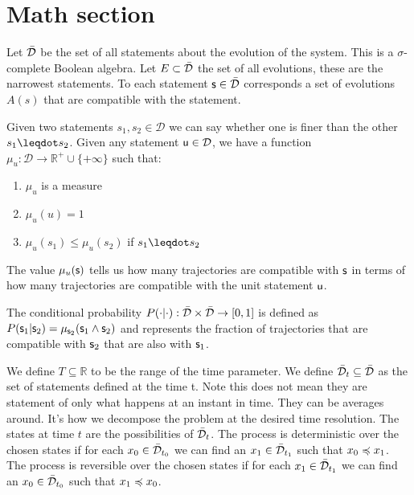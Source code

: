 \documentclass[letterpaper]{article}
\begin{document}
\section{Math section}

Let $\tdomain$ be the set of all statements about the evolution of the system. This is a $\sigma$-complete Boolean algebra. Let $E \subset \tdomain$ the set of all evolutions, these are the narrowest statements. To each statement $\stmt \in \tdomain$ corresponds a set of evolutions $A(s)$ that are compatible with the statement.

Given two statements $s_1, s_2 \in \mathcal{D}$ we can say whether one is finer than the other $s_1 \finer s_2$. Given any statement $\stmt[u] \in \mathcal{D}$, we have a function $\mu_u : \mathcal{D} \to \mathbb{R}^+\cup \{+\infty \}$ such that:
\begin{enumerate}
	\item $\mu_u$ is a measure
	\item $\mu_u(u) = 1$
	\item $\mu_u(s_1) \leq \mu_u(s_2)$ if $s_1 \finer s_2$
\end{enumerate}
The value $\mu_u(\stmt)$ tells us how many trajectories are compatible with $\stmt$ in terms of how many trajectories are compatible with the unit statement $\stmt[u]$.

The conditional probability $P(\cdot | \cdot) : \tdomain \times \tdomain \to [0,1]$ is defined as $P(\stmt_1 | \stmt_2) = \mu_{\stmt_2}(\stmt_1 \AND \stmt_2)$ and represents the fraction of trajectories that are compatible with $\stmt_2$ that are also with $\stmt_1$.

We define $T \subseteq \mathbb{R}$ to be the range of the time parameter. We define $\tdomain_{t} \subseteq \tdomain$ as the set of statements defined at the time t. Note this does not mean they are statement of only what happens at an instant in time. They can be averages around. It's how we decompose the problem at the desired time resolution. The states at time $t$ are the possibilities of $\tdomain_t$. The process is deterministic over the chosen states if for each $x_0 \in \tdomain_{t_0}$ we can find an $x_1 \in \tdomain_{t_1}$ such that $x_0 \narrower x_1$.  The process is reversible over the chosen states if for each $x_1 \in \tdomain_{t_1}$ we can find an $x_0 \in \tdomain_{t_0}$ such that $x_1 \narrower x_0$.


\end{document}

